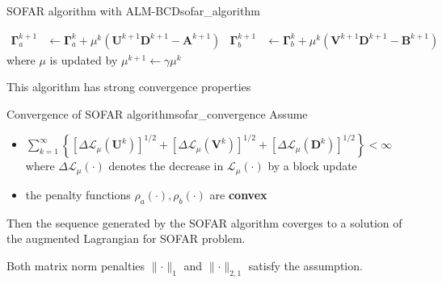 \documentclass[twoside]{article}
\begin{document}
\begin{algorithm}{SOFAR algorithm with ALM-BCD}{sofar_algorithm}
\begin{itemize}
\begin{itemize}
            \begin{align*}
                \boldsymbol{\Gamma}^{k+1}_a &\leftarrow \boldsymbol{\Gamma}^k_a + \mu^k\left(\mathbf{U}^{k+1}\mathbf{D}^{k+1}-\mathbf{A}^{k+1}\right) & \boldsymbol{\Gamma}^{k+1}_b &\leftarrow \boldsymbol{\Gamma}^k_b + \mu^k\left(\mathbf{V}^{k+1}\mathbf{D}^{k+1}-\mathbf{B}^{k+1}\right) 
            \end{align*}
            where $\mu$ is updated by $\mu^{k+1}\leftarrow\gamma \mu^k$
        \end{itemize}
    \end{itemize}
\end{algorithm}

This algorithm has strong convergence properties 
\begin{theorem}{Convergence of SOFAR algorithm}{sofar_convergence}
    Assume
    \begin{itemize}
        \item $\sum^{\infty}_{k=1}\left\{ \left[\Delta\mathcal{L}_{\mu}(\mathbf{U}^k)\right]^{1/2} + \left[\Delta\mathcal{L}_{\mu}(\mathbf{V}^k)\right]^{1/2} + \left[\Delta\mathcal{L}_{\mu}(\mathbf{D}^k)\right]^{1/2} \right\}< \infty$ where $\Delta\mathcal{L}_{\mu}(\cdot)$ denotes the decrease in $\mathcal{L}_{\mu}(\cdot)$ by a block update
        \item the penalty functions $\rho_a(\cdot),\rho_b(\cdot)$ are \textbf{convex}
    \end{itemize}
    Then the sequence generated by the SOFAR algorithm coverges to a  solution of the augmented Lagrangian for SOFAR problem.
\end{theorem}
Both matrix norm penalties $\lVert \cdot \rVert _1$ and $\lVert \cdot \rVert _{2,1}$ satisfy the assumption.

%
%
\end{document}
